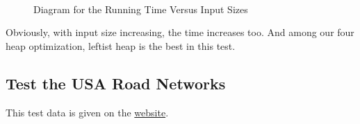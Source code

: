 \documentclass[twoside]{article}
\begin{document}
\begin{CJK*}{UTF8}{gbsn}
\begin{figure}[H]
{    }
    \\
    \caption{Diagram for the Running Time Versus Input Sizes}
\end{figure}
Obviously, with input size increasing, the time increases too. And among our four heap optimization, leftist heap is the best in this test.   
\subsection{Test the USA Road Networks}
This test data is given on the \href{http://www.dis.uniroma1.it/challenge9/download.shtml}{website}. 


\end{CJK*}
\end{document}
